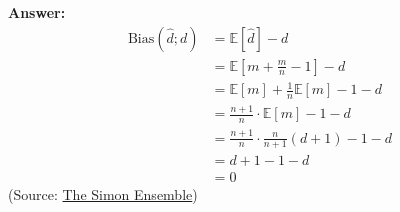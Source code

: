 \documentclass{article}
\newenvironment{QandA}{\begin{enumerate}[label=\arabic*.]}{\end{enumerate}}
\newenvironment{answer}{\par\normalfont \textbf{Answer:}}{}
\newcommand{\Exp}[1]{\mathbb{E}\left[ #1 \right]}
\begin{document}
\begin{QandA}
\begin{answer}
        \begin{align*}
            \text{Bias}(\hat{d}; d) &= \Exp{\hat{d}} - d \\
            &= \Exp{m + \frac{m}{n} - 1 } - d \\
            &= \Exp{m} + \frac{1}{n}\Exp{m} - 1 -d \\
            &= \frac{n+1}{n} \cdot \Exp{m} - 1 - d \\
            &= \frac{n+1}{n} \cdot \frac{n}{n+1}(d+1) - 1 - d \\
            &= d + 1 - 1 - d \\
            &= 0
        \end{align*}
        (Source: \href{https://simonensemble.github.io/2019-11/german-tank-problem}{The Simon Ensemble})
    \end{answer}
    

\end{QandA}
\end{document}
